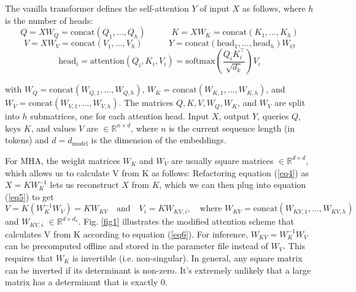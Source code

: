 \documentclass{article}
\newcommand{\eR}[2]{$\in \mathbb{R}^{#1 \times #2}$} %
\begin{document}
The vanilla transformer \citep{vanilla} defines the self-attention $Y$ of input $X$ as follows, where $h$ is the number of heads:
\begin{equation}
  Q = X W_Q = \text{concat} \left( Q_1, \ldots, Q_h \right) \qquad \quad K = X W_K = \text{concat} \left( K_1, \ldots, K_h \right) \label{eq4}
\end{equation}
\begin{equation}
  V = X W_V = \text{concat} \left( V_1, \ldots, V_h \right) \qquad \quad Y = \text{concat} \left( \text{head}_1, \ldots, \text{head}_h \right) W_O  \label{eq5}
\end{equation}
\begin{equation}
  \text{head}_i = \text{attention} \left( Q_i, K_i, V_i \right) = \text{softmax} \left( \frac{Q_i K_i^\top}{\sqrt{d_k}} \right) V_i \label{eq2}
\end{equation}

with $W_Q = \text{concat}(W_{Q,1}, \ldots, W_{Q,h})$, $W_K = \text{concat}(W_{K,1}, \ldots, W_{K,h})$, and $W_V = \text{concat}(W_{V,1}, \ldots, W_{V,h})$. The matrices $Q, K, V, W_Q, W_K$, and $W_V$ are split into $h$ submatrices, one for each attention head. Input $X$, output $Y$, queries $Q$, keys $K$, and values $V$ are \eR{n}{d}, where $n$ is the current sequence length (in tokens) and $d = d_{\text{model}}$ is the dimension of the embeddings.

For MHA, the weight matrices $W_K$ and $W_V$ are usually square matrices \eR{d}{d}, which allows us to calculate V from K as follows: Refactoring equation (\ref{eq4}) as $X = K W_K^{-1}$ lets us reconstruct $X$ from $K$, which we can then plug into equation (\ref{eq5}) to get
\begin{equation}
  V = K (W_K^{-1} W_V) = K W_{KV} \quad \text{and} \quad V_i = K W_{KV,i}, \quad \text{where } W_{KV} = \text{concat}(W_{KV,1}, \ldots, W_{KV,h})
\label{eq6} \end{equation}
and $W_{KV,i}$ \eR{d}{d_v}. Fig. \ref{fig1} illustrates the modified attention scheme that calculates V from K according to equation (\ref{eq6}). For inference, $W_{KV} = W_K^{-1} W_V$ can be precomputed offline and stored in the parameter file instead of $W_V$. This requires that $W_K$ is invertible (i.e. non-singular). In general, any square matrix can be inverted if its determinant is non-zero. It’s extremely unlikely that a large matrix has a determinant that is exactly 0.
\end{document}
